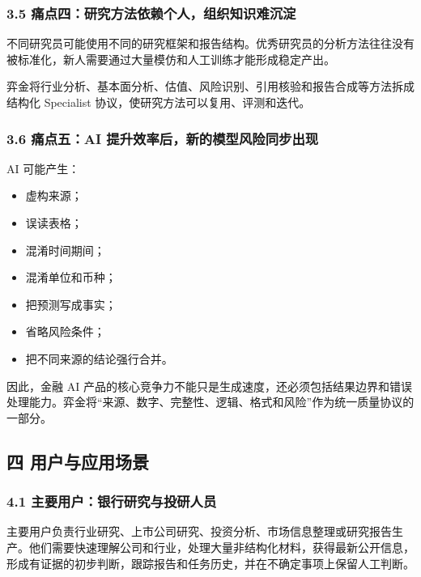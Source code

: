 \documentclass[a4paper,12pt,fontset=none]{ctexart}
\begin{document}
\subsubsection{3.5
痛点四：研究方法依赖个人，组织知识难沉淀}\label{ux75dbux70b9ux56dbux7814ux7a76ux65b9ux6cd5ux4f9dux8d56ux4e2aux4ebaux7ec4ux7ec7ux77e5ux8bc6ux96beux6c89ux6dc0}

不同研究员可能使用不同的研究框架和报告结构。优秀研究员的分析方法往往没有被标准化，新人需要通过大量模仿和人工训练才能形成稳定产出。

弈金将行业分析、基本面分析、估值、风险识别、引用核验和报告合成等方法拆成结构化
Specialist 协议，使研究方法可以复用、评测和迭代。

\subsubsection{3.6 痛点五：AI
提升效率后，新的模型风险同步出现}\label{ux75dbux70b9ux4e94ai-ux63d0ux5347ux6548ux7387ux540eux65b0ux7684ux6a21ux578bux98ceux9669ux540cux6b65ux51faux73b0}

AI 可能产生：

\begin{itemize}
\tightlist
\item
  虚构来源；
\item
  误读表格；
\item
  混淆时间期间；
\item
  混淆单位和币种；
\item
  把预测写成事实；
\item
  省略风险条件；
\item
  把不同来源的结论强行合并。
\end{itemize}

因此，金融 AI
产品的核心竞争力不能只是生成速度，还必须包括结果边界和错误处理能力。弈金将``来源、数字、完整性、逻辑、格式和风险''作为统一质量协议的一部分。

\subsection{四
用户与应用场景}\label{ux56db-ux7528ux6237ux4e0eux5e94ux7528ux573aux666f}

\subsubsection{4.1
主要用户：银行研究与投研人员}\label{ux4e3bux8981ux7528ux6237ux94f6ux884cux7814ux7a76ux4e0eux6295ux7814ux4ebaux5458}

主要用户负责行业研究、上市公司研究、投资分析、市场信息整理或研究报告生产。他们需要快速理解公司和行业，处理大量非结构化材料，获得最新公开信息，形成有证据的初步判断，跟踪报告和任务历史，并在不确定事项上保留人工判断。
\end{document}
